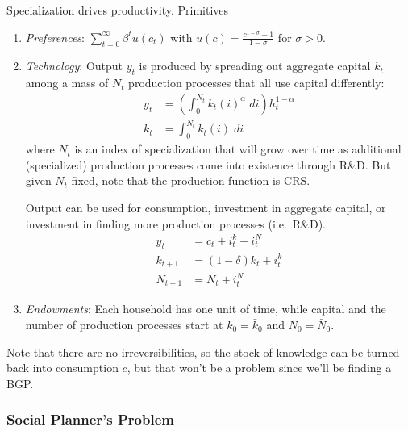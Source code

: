 \documentclass[12pt]{article}
\theoremstyle{plain}
\theoremstyle{definition}
\theoremstyle{remark}
\newcommand{\sumtinfz}{\sum^\infty_{t=0}}
\begin{document}
Specialization drives productivity. Primitives
\begin{enumerate}
  \item \emph{Preferences}: $\sumtinfz \beta^t u(c_t)$ with
    $u(c)=\frac{c^{1-\sigma}-1}{1-\sigma}$ for $\sigma>0$.
  \item \emph{Technology}:
    Output $y_t$ is produced by spreading out aggregate capital $k_t$
    among a mass of $N_t$ production processes that all use capital
    differently:
    \begin{align*}
      y_t &=
      \left(
      \int_{0}^{N_t} k_t(i)^\alpha \;di \right)
      h_t^{1-\alpha} \\
      k_t &= \int_0^{N_t} k_t(i) \; di
    \end{align*}
    where $N_t$ is an index of specialization that will grow over time
    as additional (specialized) production processes come into
    existence through R\&D. But given $N_t$ fixed, note that the
    production function is CRS.

    Output can be used for consumption, investment in aggregate
    capital, or investment in finding more production processes
    (i.e.\ R\&D).
    \begin{align*}
      y_t &= c_t + i_t^k + i_t^N \\
      k_{t+1} &= (1-\delta)k_t + i_t^k \\
      N_{t+1} &= N_t + i_t^N
    \end{align*}

  \item \emph{Endowments}: Each household has one unit of time, while
    capital and the number of production processes start at
    $k_0=\bar{k}_0$ and $N_0=\bar{N}_0$.
\end{enumerate}
Note that there are no irreversibilities, so the stock of knowledge can
be turned back into consumption $c$, but that won't be a problem since
we'll be finding a BGP.


\subsubsection{Social Planner's Problem}
\end{document}
